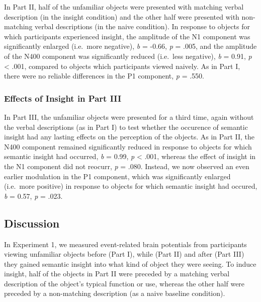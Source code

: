 \documentclass[
  english,
  man,11pt,floatsintext]{apa7}
\begin{document}
In Part II, half of the unfamiliar objects were presented with matching verbal description (in the insight condition) and the other half were presented with non-matching verbal descriptions (in the naive condition). In response to objects for which participants experienced insight, the amplitude of the N1 component was significantly enlarged (i.e.~more negative), \emph{b} = -0.66, \emph{p} = .005, and the amplitude of the N400 component was significantly reduced (i.e.~less negative), \emph{b} = 0.91, \emph{p} \textless{} .001, compared to objects which participants viewed naively. As in Part I, there were no reliable differences in the P1 component, \emph{p} = .550.

\hypertarget{effects-of-insight-in-part-iii}{%
\subsubsection{Effects of Insight in Part III}\label{effects-of-insight-in-part-iii}}

In Part III, the unfamiliar objects were presented for a third time, again without the verbal descriptions (as in Part I) to test whether the occurence of semantic insight had any lasting effects on the perception of the objects. As in Part II, the N400 component remained significantly reduced in response to objects for which semantic insight had occurred, \emph{b} = 0.99, \emph{p} \textless{} .001, whereas the effect of insight in the N1 component did not reocurr, \emph{p} = .080. Instead, we now observed an even earlier modulation in the P1 component, which was significantly enlarged (i.e.~more positive) in response to objects for which semantic insight had occured, \emph{b} = 0.57, \emph{p} = .023.

\hypertarget{discussion}{%
\subsection{Discussion}\label{discussion}}

In Experiment 1, we measured event-related brain potentials from participants viewing unfamiliar objects before (Part I), while (Part II) and after (Part III) they gained semantic insight into what kind of object they were seeing. To induce insight, half of the objects in Part II were preceded by a matching verbal description of the object's typical function or use, whereas the other half were preceded by a non-matching description (as a naive baseline condition).
\end{document}
